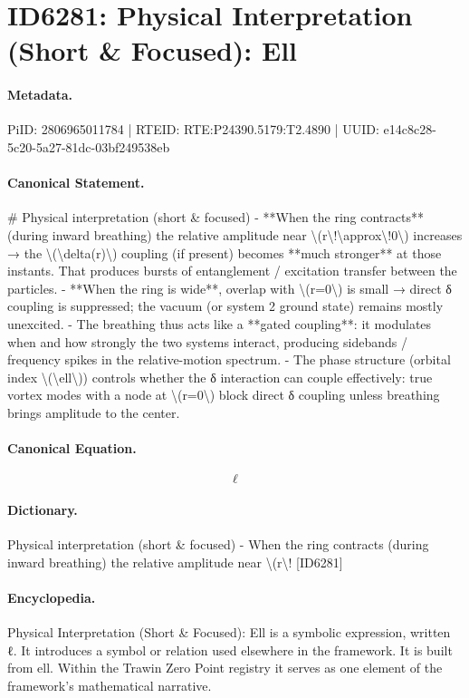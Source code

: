 \section*{ID6281: Physical Interpretation (Short \& Focused): Ell}
\paragraph{Metadata.}
PiID: 2806965011784 | RTEID: RTE:P24390.5179:T2.4890 | UUID: e14c8c28-5c20-5a27-81dc-03bf249538eb

\paragraph{Canonical Statement.}
\# Physical interpretation (short \& focused) - **When the ring contracts** (during inward breathing) the relative amplitude near \textbackslash{}(r\textbackslash{}!\textbackslash{}approx\textbackslash{}!0\textbackslash{}) increases → the \textbackslash{}(\textbackslash{}delta(r)\textbackslash{}) coupling (if present) becomes **much stronger** at those instants. That produces bursts of entanglement / excitation transfer between the particles. - **When the ring is wide**, overlap with \textbackslash{}(r=0\textbackslash{}) is small → direct δ coupling is suppressed; the vacuum (or system 2 ground state) remains mostly unexcited. - The breathing thus acts like a **gated coupling**: it modulates when and how strongly the two systems interact, producing sidebands / frequency spikes in the relative-motion spectrum. - The phase structure (orbital index \textbackslash{}(\textbackslash{}ell\textbackslash{})) controls whether the δ interaction can couple effectively: true vortex modes with a node at \textbackslash{}(r=0\textbackslash{}) block direct δ coupling unless breathing brings amplitude to the center.

\paragraph{Canonical Equation.}
\[
\ell
\]

\paragraph{Dictionary.}
Physical interpretation (short \& focused) - When the ring contracts (during inward breathing) the relative amplitude near \textbackslash{}(r\textbackslash{}! [ID6281]

\paragraph{Encyclopedia.}
Physical Interpretation (Short \& Focused): Ell is a symbolic expression, written ℓ. It introduces a symbol or relation used elsewhere in the framework. It is built from ell. Within the Trawin Zero Point registry it serves as one element of the framework's mathematical narrative.
